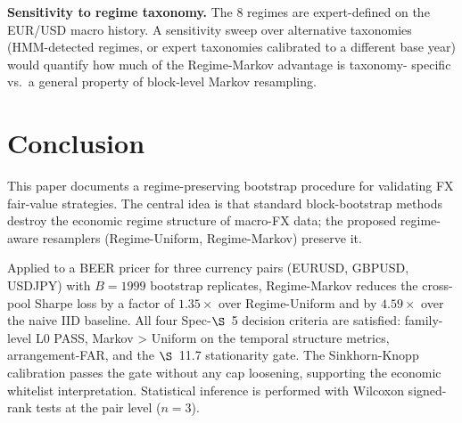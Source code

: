 \documentclass[11pt,a4paper]{article}
\theoremstyle{definition}
\begin{document}
\textbf{Sensitivity to regime taxonomy.} The 8 regimes are
expert-defined on the EUR/USD macro history. A sensitivity
sweep over alternative taxonomies (HMM-detected regimes, or
expert taxonomies calibrated to a different base year) would
quantify how much of the Regime-Markov advantage is taxonomy-
specific vs.\ a general property of block-level Markov resampling.

\section{Conclusion}
\label{sec:concl}

This paper documents a regime-preserving bootstrap procedure for
validating FX fair-value strategies. The central idea is that
standard block-bootstrap methods destroy the economic regime
structure of macro-FX data; the proposed regime-aware
resamplers (Regime-Uniform, Regime-Markov) preserve it.

Applied to a BEER pricer for three currency pairs
(EURUSD, GBPUSD, USDJPY) with $B = 1999$ bootstrap replicates,
Regime-Markov reduces the cross-pool Sharpe loss by a factor of
$1.35\times$ over Regime-Uniform and by $4.59\times$ over the
naive IID baseline. All four Spec-$\S$~5 decision criteria are
satisfied: family-level L0 PASS, Markov > Uniform on the
temporal structure metrics, arrangement-FAR, and the $\S$~11.7
stationarity gate. The Sinkhorn-Knopp calibration passes the gate
without any cap loosening, supporting the economic whitelist
interpretation. Statistical inference is performed with
Wilcoxon signed-rank tests at the pair level ($n=3$).
\end{document}
